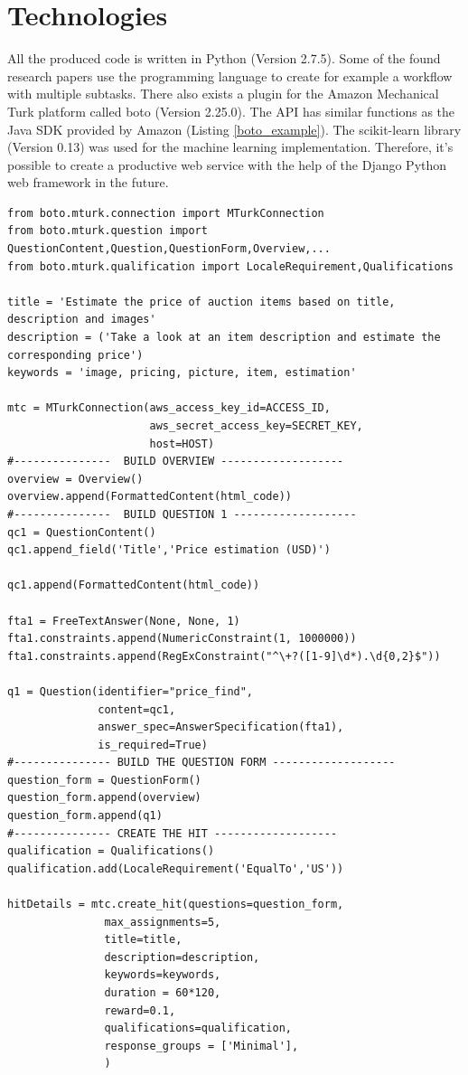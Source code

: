 \section{Technologies}
All the produced code is written in Python (Version 2.7.5). Some of the found research papers use the programming language to create for example a workflow with multiple subtasks. There also exists a plugin for the Amazon Mechanical Turk platform called boto (Version 2.25.0). The API has similar functions as the Java SDK provided by Amazon (Listing \ref{boto_example}). The scikit-learn library (Version 0.13) was used for the machine learning implementation. Therefore, it's possible to create a productive web service with the help of the Django Python web framework in the future.
\begin{lstlisting}
from boto.mturk.connection import MTurkConnection
from boto.mturk.question import QuestionContent,Question,QuestionForm,Overview,...
from boto.mturk.qualification import LocaleRequirement,Qualifications

title = 'Estimate the price of auction items based on title, description and images'
description = ('Take a look at an item description and estimate the corresponding price')
keywords = 'image, pricing, picture, item, estimation'

mtc = MTurkConnection(aws_access_key_id=ACCESS_ID,
                      aws_secret_access_key=SECRET_KEY,
                      host=HOST)
#---------------  BUILD OVERVIEW -------------------
overview = Overview()
overview.append(FormattedContent(html_code))
#---------------  BUILD QUESTION 1 -------------------
qc1 = QuestionContent()
qc1.append_field('Title','Price estimation (USD)')
 
qc1.append(FormattedContent(html_code))
 
fta1 = FreeTextAnswer(None, None, 1)
fta1.constraints.append(NumericConstraint(1, 1000000))          
fta1.constraints.append(RegExConstraint("^\+?([1-9]\d*).\d{0,2}$"))
 
q1 = Question(identifier="price_find",
              content=qc1,
              answer_spec=AnswerSpecification(fta1),
              is_required=True)
#--------------- BUILD THE QUESTION FORM -------------------
question_form = QuestionForm()
question_form.append(overview)
question_form.append(q1)
#--------------- CREATE THE HIT -------------------
qualification = Qualifications()
qualification.add(LocaleRequirement('EqualTo','US'))

hitDetails = mtc.create_hit(questions=question_form,
               max_assignments=5,
               title=title,
               description=description,
               keywords=keywords,
               duration = 60*120,
               reward=0.1,
               qualifications=qualification,
               response_groups = ['Minimal'],
               ) 
\end{lstlisting}
